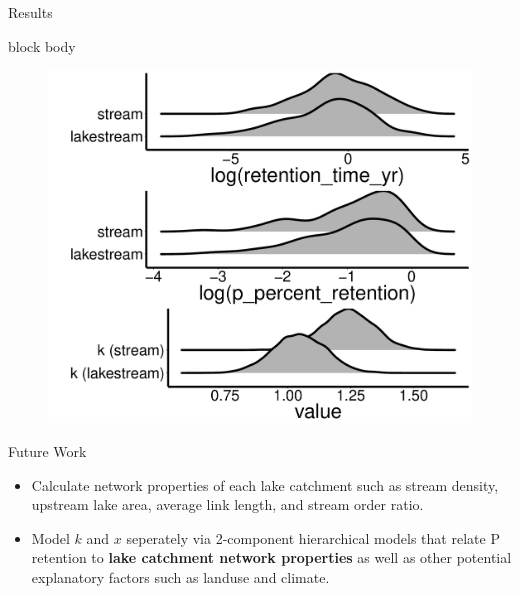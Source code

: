 \documentclass[final,hyperref={pdfpagelabels=false}]{beamer}
\begin{document}
\begin{frame}[t]
\begin{columns}[t]
\begin{column}{.465\textwidth}
\begin{block}{Results}
\vspace{0.5em}
{
\begin{beamercolorbox}[wd=\textwidth,rounded=true]{block body}

\begin{figure}
  \includegraphics[width=30cm]{gleon_poster.pdf}
\end{figure}

\end{beamercolorbox}
}
\vspace{0.5em}
\end{block}


\vspace{0.8em}

\begin{block}{Future Work}

\begin{itemize}
\item Calculate network properties of each lake catchment such as stream density, upstream lake area, average link length, and stream order ratio.
\vspace{1em}
\item Model $k$ and $x$ seperately via 2-component hierarchical models that relate P retention to \textbf{lake catchment network properties} as well as other potential explanatory factors such as landuse and climate.
\end{itemize}
\end{block}



\end{column}
\end{columns}
\end{frame}
\end{document}
